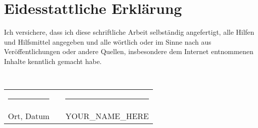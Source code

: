 \newpage

\section*{Eidesstattliche Erklärung}

Ich versichere, dass ich diese schriftliche Arbeit selbständig angefertigt, alle Hilfen und Hilfsmittel angegeben und alle wörtlich oder im Sinne nach aus Veröffentlichungen oder andere Quellen, insbesondere dem Internet entnommenen Inhalte kenntlich gemacht habe.

\begin{verbatim}


\end{verbatim}

\noindent
\begin{tabular}{lcl}
\rule{5cm}{0.5pt} & \hspace{2cm} & \rule{5cm}{0.5pt} \\
Ort, Datum & & YOUR\_NAME\_HERE
\end{tabular}

